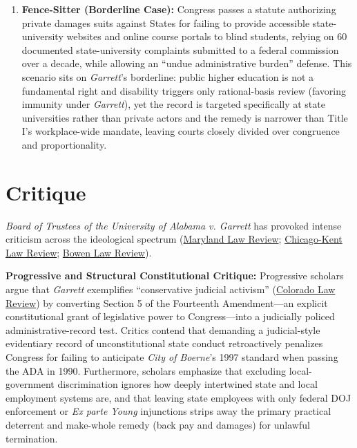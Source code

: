 \documentclass[12pt]{article}
\begin{document}
\begin{enumerate}
\item \textbf{Fence-Sitter (Borderline Case):} Congress passes a statute authorizing private damages suits against States for failing to provide accessible state-university websites and online course portals to blind students, relying on 60 documented state-university complaints submitted to a federal commission over a decade, while allowing an ``undue administrative burden'' defense. This scenario sits on \textit{Garrett}'s borderline: public higher education is not a fundamental right and disability triggers only rational-basis review (favoring immunity under \textit{Garrett}), yet the record is targeted specifically at state universities rather than private actors and the remedy is narrower than Title I's workplace-wide mandate, leaving courts closely divided over congruence and proportionality.
\end{enumerate}

\section{Critique}

\textit{Board of Trustees of the University of Alabama v. Garrett} has provoked intense criticism across the ideological spectrum (\href{https://digitalcommons.law.umaryland.edu/cgi/viewcontent.cgi?article=3119&context=mlr}{Maryland Law Review}; \href{https://scholarship.kentlaw.iit.edu/cgi/viewcontent.cgi?article=3368&context=cklawreview}{Chicago-Kent Law Review}; \href{https://research.ualr.edu/bowen_lawreview/vol42/iss3/6/}{Bowen Law Review}).

\textbf{Progressive and Structural Constitutional Critique:} Progressive scholars argue that \textit{Garrett} exemplifies ``conservative judicial activism'' (\href{https://lawreview.colorado.edu/wp-content/uploads/2025/12/Young.pdf}{Colorado Law Review}) by converting Section 5 of the Fourteenth Amendment---an explicit constitutional grant of legislative power to Congress---into a judicially policed administrative-record test. Critics contend that demanding a judicial-style evidentiary record of unconstitutional state conduct retroactively penalizes Congress for failing to anticipate \textit{City of Boerne}'s 1997 standard when passing the ADA in 1990. Furthermore, scholars emphasize that excluding local-government discrimination ignores how deeply intertwined state and local employment systems are, and that leaving state employees with only federal DOJ enforcement or \textit{Ex parte Young} injunctions strips away the primary practical deterrent and make-whole remedy (back pay and damages) for unlawful termination.
\end{document}
